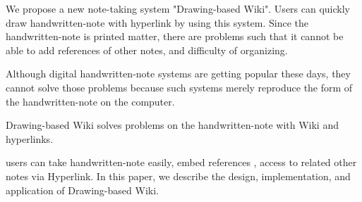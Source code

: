 \begin{eabstract}

 We propose a new  note-taking system "Drawing-based Wiki".
 Users can quickly draw handwritten-note with hyperlink by using this system.
 Since the handwritten-note is printed matter, there are problems such that it cannot be able to add references of other notes, and difficulty of organizing.

 Although digital handwritten-note systems are getting popular these days, they cannot solve those problems because such systems merely reproduce the form of the handwritten-note on the computer.

 Drawing-based Wiki solves problems on the handwritten-note with Wiki and hyperlinks.

 users can take handwritten-note easily, embed references , access to related other notes via Hyperlink.
 In this paper, we describe the design, implementation, and application of Drawing-based Wiki.

\end{eabstract}
